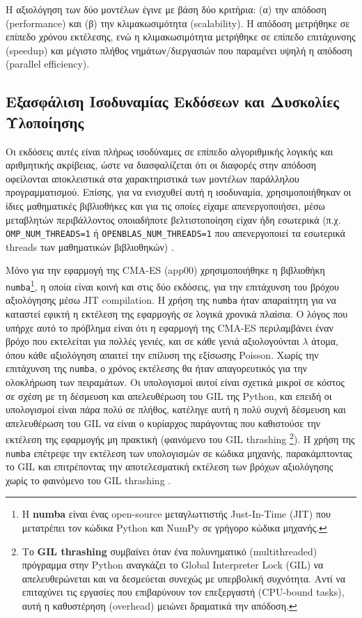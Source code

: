 Η αξιολόγηση των δύο μοντέλων έγινε με βάση δύο κριτήρια: (α) την απόδοση (performance) και (β) την κλιμακωσιμότητα (scalability). Η απόδοση μετρήθηκε σε επίπεδο χρόνου εκτέλεσης, ενώ η κλιμακωσιμότητα μετρήθηκε σε επίπεδο επιτάχυνσης (speedup) και μέγιστο πλήθος νημάτων/διεργασιών που παραμένει υψηλή η απόδοση (parallel efficiency).

\subsection{Εξασφάλιση Ισοδυναμίας Εκδόσεων και Δυσκολίες Υλοποίησης}

Οι εκδόσεις αυτές είναι πλήρως ισοδύναμες σε επίπεδο αλγοριθμικής λογικής και αριθμητικής ακρίβειας, ώστε να διασφαλίζεται ότι οι διαφορές στην απόδοση οφείλονται αποκλειστικά στα χαρακτηριστικά των μοντέλων παράλληλου προγραμματισμού. Επίσης, για να ενισχυθεί αυτή η ισοδυναμία, χρησιμοποιήθηκαν οι ίδιες μαθηματικές βιβλιοθήκες και για τις οποίες είχαμε απενεργοποιήσει, μέσω μεταβλητών περιβάλλοντος οποιαδήποτε βελτιστοποίηση είχαν ήδη εσωτερικά (π.χ. \texttt{OMP\_NUM\_THREADS=1} ή \texttt{OPENBLAS\_NUM\_THREADS=1} που απενεργοποιεί τα εσωτερικά threads των μαθηματικών βιβλιοθηκών) \cite{appcode}. 

Μόνο για την εφαρμογή της CMA-ES (app00) χρησιμοποιήθηκε η βιβλιοθήκη \texttt{numba}\footnote{Η \textbf{numba} είναι ένας open-source μεταγλωττιστής Just-In-Time (JIT) που μετατρέπει τον κώδικα Python και NumPy σε γρήγορο κώδικα μηχανής.}, η οποία είναι κοινή και στις δύο εκδόσεις, για την επιτάχυνση του βρόχου αξιολόγησης μέσω JIT compilation. Η χρήση της \texttt{numba} ήταν απαραίτητη για να καταστεί εφικτή η εκτέλεση της εφαρμογής σε λογικά χρονικά πλαίσια. Ο λόγος που υπήρχε αυτό το πρόβλημα είναι ότι η εφαρμογή της CMA-ES περιλαμβάνει έναν βρόχο που εκτελείται για πολλές γενιές, και σε κάθε γενιά αξιολογούνται $\lambda$ άτομα, όπου κάθε αξιολόγηση απαιτεί την επίλυση της εξίσωσης Poisson. Χωρίς την επιτάχυνση της \texttt{numba}, ο χρόνος εκτέλεσης θα ήταν απαγορευτικός για την ολοκλήρωση των πειραμάτων. Οι υπολογισμοί αυτοί είναι σχετικά μικροί σε κόστος σε σχέση με τη δέσμευση και απελευθέρωση του GIL της Python, και επειδή οι υπολογισμοί είναι πάρα πολύ σε πλήθος, κατέληγε αυτή η πολύ συχνή δέσμευση και απελευθέρωση του GIL να είναι ο κυρίαρχος παράγοντας που καθιστούσε την εκτέλεση της εφαρμογής μη πρακτική (φαινόμενο του GIL thrashing \footnote{Το \textbf{GIL thrashing} συμβαίνει όταν ένα πολυνηματικό (multithreaded) πρόγραμμα στην Python αναγκάζει το Global Interpreter Lock (GIL) να απελευθερώνεται και να δεσμεύεται συνεχώς με υπερβολική συχνότητα. Αντί να επιταχύνει τις εργασίες που επιβαρύνουν τον επεξεργαστή (CPU-bound tasks), αυτή η καθυστέρηση (overhead) μειώνει δραματικά την απόδοση.}). Η χρήση της \texttt{numba} επέτρεψε την εκτέλεση των υπολογισμών σε κώδικα μηχανής, παρακάμπτοντας το GIL και επιτρέποντας την αποτελεσματική εκτέλεση των βρόχων αξιολόγησης χωρίς το φαινόμενο του GIL thrashing \cite{appcode}.

